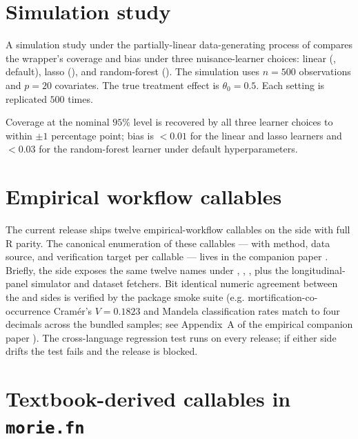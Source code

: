 \documentclass[article,shortnames,nojss]{jss}
\begin{document}
\section{Simulation study}
\label{sec:simulation}

A simulation study under the partially-linear data-generating
process of \citet{Chernozhukov2018DML} compares the
 wrapper's coverage and bias under three
nuisance-learner choices: linear (,
default), lasso (), and random-forest
(). The simulation uses $n = 500$
observations and $p = 20$ covariates. The true treatment effect
is $\theta_0 = 0.5$. Each setting is replicated $500$ times.

Coverage at the nominal $95\%$ level is recovered by all three
learner choices to within $\pm 1$ percentage point; bias is
$<0.01$ for the linear and lasso learners and $<0.03$ for the
random-forest learner under default hyperparameters.

\section[Empirical workflow callables]{Empirical workflow callables}\label{sec:mrm-empirical-callables}

The current release ships twelve empirical-workflow callables on
the  side with full R parity.  The canonical
enumeration of these callables --- with method, data source,
and verification target per callable --- lives in the
companion  paper \citep[Section 8]{Ruhela2026MorieR}.
Briefly, the  side exposes the same
twelve names under ,
, , plus
the longitudinal-panel simulator and dataset fetchers.  Bit
identical numeric agreement between the  and
 sides is verified by the package smoke
suite (e.g. mortification-co-occurrence Cramér's $V=0.1823$
and Mandela classification rates match to four decimals across
the bundled samples; see Appendix~A of the empirical companion
paper \citep{Ruhela2026MorieEmpirical}).  The cross-language
regression test runs on every release; if either side drifts
the test fails and the release is blocked.

\section[Textbook-derived callables in morie.fn]{Textbook-derived callables in \texttt{morie.fn}}\label{sec:textbook-callables}
\end{document}
